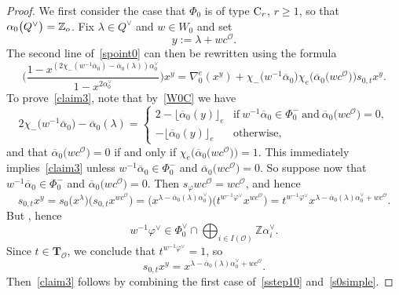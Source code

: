 \documentclass[pdftex]{sigma}
\numberwithin{equation}{section}
\begin{document}
\begin{proof}
We first consider the case that $\Phi_0$ is of type ${\rm C}_r$, $r\geq 1$, so that $\alpha_0\smash{\bigl(Q^\vee\bigr)}=\mathbb{Z}_o$.
Fix $\lambda\in Q^\vee$ and $w\in W_0$ and set
\[
y:=\lambda+wc^\mathcal{O}.
\]
The second line of~\eqref{spoint0} can then be rewritten using the formula
\begin{equation}\label{claim3}
\Biggl(\frac{1-x^{(2\chi_-(w^{-1}\overline{\alpha}_0)-\overline{\alpha}_0(\lambda))\alpha_0^\vee}}{1-x^{2\alpha_0^\vee}}\Biggr)x^{y}=
\nabla_0^e(x^y)
+\chi_-\bigl(w^{-1}\overline{\alpha}_0\bigr)\chi_e\bigl(\overline{\alpha}_0\bigl(wc^\mathcal{O}\bigr)\bigr)s_{0,t}x^{y}.
\end{equation}
To prove~\eqref{claim3}, note that by~\eqref{W0C} we have
\begin{equation}
\label{sstep10}
2\chi_-\bigl(w^{-1}\overline{\alpha}_0\bigr)-\overline{\alpha}_0(\lambda)=
\begin{cases}
2-\lfloor\overline{\alpha}_0(y)\rfloor_e &\text{if}\ w^{-1}\overline{\alpha}_0\in\Phi_0^-\ \text{and}\ \overline{\alpha}_0\bigl(wc^\mathcal{O}\bigr)=0,\\
-\lfloor\overline{\alpha}_0(y)\rfloor_e &\text{otherwise},
\end{cases}
\end{equation}
and that $\overline{\alpha}_0\bigl(wc^\mathcal{O}\bigr)=0$ if and only if $\chi_e\bigl(\overline{\alpha}_0\bigl(wc^\mathcal{O}\bigr)\bigr)=1$.
This immediately implies~\eqref{claim3} unless
$w^{-1}\overline{\alpha}_0\in\Phi_0^-$ and $\overline{\alpha}_0\bigl(wc^\mathcal{O}\bigr)=0$.
So suppose now that $w^{-1}\overline{\alpha}_0\in\Phi_0^-$ and $\overline{\alpha}_0\bigl(wc^\mathcal{O}\bigr)=0$. Then $s_\varphi wc^\mathcal{O}=wc^\mathcal{O}$, and hence
\[
s_{0,t}x^y=s_0\bigl(x^\lambda\bigr)\bigl(s_{0,t}x^{wc^\mathcal{O}}\bigr)=\bigl(x^{\lambda-\overline{\alpha}_0(\lambda)\alpha_0^\vee}\bigr)\bigl(t^{w^{-1}\varphi^\vee}x^{wc^\mathcal{O}}\bigr)
=t^{w^{-1}\varphi^\vee}x^{\lambda-\overline{\alpha}_0(\lambda)\alpha_0^\vee+wc^\mathcal{O}}.
\]
But , hence
\[
w^{-1}\varphi^\vee\in\Phi_0^\vee\cap\bigoplus_{i\in I(\mathcal{O})}\mathbb{Z}\alpha_i^\vee.
\]
 Since $t\in\mathbf{T}_\mathcal{O}$,
we conclude that ${t^{w^{-1}\varphi^\vee}=1}$, so
\begin{equation}\label{s0simple}
s_{0,t}x^y=x^{\lambda-\overline{\alpha}_0(\lambda)\alpha_0^\vee+wc^\mathcal{O}}.
\end{equation}
Then~\eqref{claim3} follows by combining the first case of~\eqref{sstep10} and~\eqref{s0simple}.


\end{proof}
\end{document}
